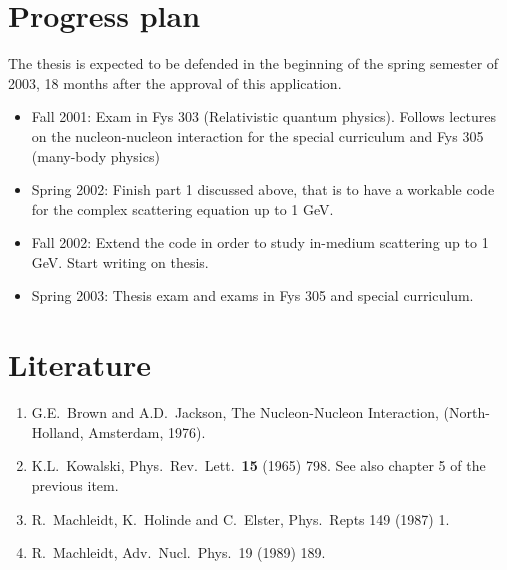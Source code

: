 \section*{Progress plan}
The thesis is expected to be defended in the beginning of the spring
semester of 2003, 18 months after the approval of this application.
\begin{itemize}
\item Fall  2001: Exam in Fys 303 (Relativistic quantum physics).
                   Follows lectures on the nucleon-nucleon interaction
                   for the special curriculum and Fys 305 (many-body physics)
\item Spring 2002:  Finish part 1 discussed above, that is to have a 
      workable code for the complex scattering equation up to 1 GeV.

\item Fall 2002: Extend the code in order to study in-medium scattering up to
      1 GeV. Start writing on thesis.
\item Spring 2003: Thesis exam and exams in Fys 305 and special curriculum.

\end{itemize}
\section*{Literature}
\begin{enumerate}
\item  G.E.\ Brown and A.D.\ Jackson,
The Nucleon-Nucleon Interaction,
(North-Holland, Amsterdam, 1976).
\item K.L.\ Kowalski, Phys.\ Rev.\ Lett.\ {\bf 15} (1965) 798. See also
chapter 5 of the previous item.
\item R.\ Machleidt, K.\ Holinde and C.\ Elster, Phys.\ Repts
 149 (1987) 1.
\item R.\ Machleidt, Adv.\ Nucl.\ Phys.\  19 (1989) 189.
\end{enumerate}














